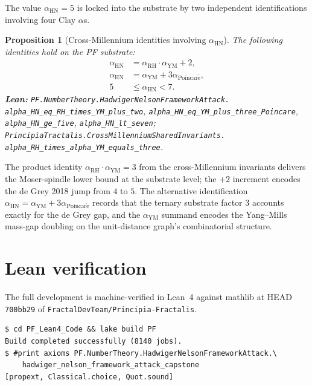 \documentclass[11pt,a4paper]{article}
\theoremstyle{plain}
\newtheorem{proposition}[theorem]{Proposition}
\theoremstyle{definition}
\begin{document}
The value $\alpha_{\mathrm{HN}} = 5$ is locked into the substrate by
two independent identifications involving four Clay $\alpha$s.

\begin{proposition}[Cross-Millennium identities involving $\alpha_{\mathrm{HN}}$]
\label{prop:cross-hn}
The following identities hold on the PF substrate:
\[
\begin{aligned}
\alpha_{\mathrm{HN}}
  &= \alpha_{\mathrm{RH}} \cdot \alpha_{\mathrm{YM}} + 2, \\
\alpha_{\mathrm{HN}}
  &= \alpha_{\mathrm{YM}} + 3 \alpha_{\mathrm{Poincar\acute e}}, \\
5 &\le \alpha_{\mathrm{HN}} < 7.
\end{aligned}
\]
\textbf{Lean:}
\texttt{PF.NumberTheory.HadwigerNelsonFrameworkAttack.\\
alpha\_HN\_eq\_RH\_times\_YM\_plus\_two},
\texttt{alpha\_HN\_eq\_YM\_plus\_three\_Poincare},
\texttt{alpha\_HN\_ge\_five},
\texttt{alpha\_HN\_lt\_seven};
\texttt{PrincipiaTractalis.CrossMillenniumSharedInvariants.\\
alpha\_RH\_times\_alpha\_YM\_equals\_three}.
\end{proposition}

The product identity $\alpha_{\mathrm{RH}} \cdot \alpha_{\mathrm{YM}}
= 3$ from the cross-Millennium invariants delivers the Moser-spindle
lower bound at the substrate level; the $+ 2$ increment encodes the de
Grey 2018 jump from $4$ to $5$. The alternative identification
$\alpha_{\mathrm{HN}} = \alpha_{\mathrm{YM}} + 3 \alpha_{\mathrm{Poincar\acute e}}$
records that the ternary substrate factor $3$ accounts exactly for the
de Grey gap, and the $\alpha_{\mathrm{YM}}$ summand encodes the
Yang--Mills mass-gap doubling on the unit-distance graph's combinatorial
structure.

\section{Lean verification}
\label{sec:lean}

The full development is machine-verified in Lean~4 against mathlib at
HEAD \texttt{700bb29} of \texttt{FractalDevTeam/Principia-Fractalis}.

\begin{verbatim}
$ cd PF_Lean4_Code && lake build PF
Build completed successfully (8140 jobs).
$ #print axioms PF.NumberTheory.HadwigerNelsonFrameworkAttack.\
    hadwiger_nelson_framework_attack_capstone
[propext, Classical.choice, Quot.sound]
\end{verbatim}
\end{document}
